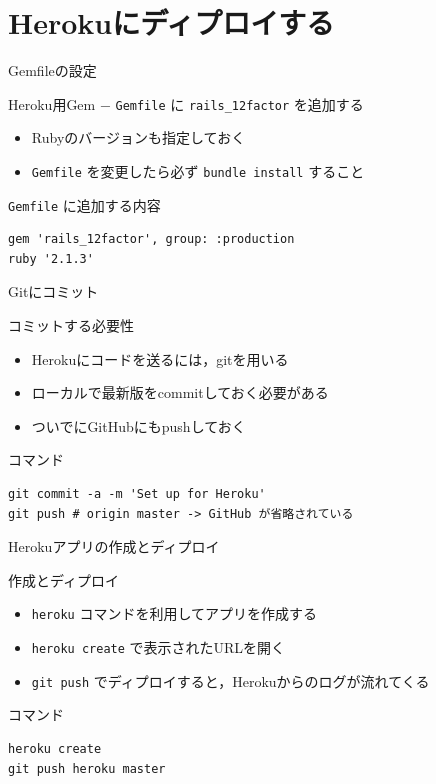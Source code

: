 \documentclass[t, aspectratio=169]{beamer}
\begin{document}
\section{Herokuにディプロイする}
\label{sec-6-3}
\begin{frame}[fragile,label=sec-6-3-1]{Gemfileの設定}
 \begin{block}{Heroku用Gem}
− \texttt{Gemfile} に \texttt{rails\_12factor} を追加する
\begin{itemize}
\item Rubyのバージョンも指定しておく
\item \texttt{Gemfile} を変更したら必ず \texttt{bundle install} すること
\end{itemize}
\end{block}
\begin{block}{\texttt{Gemfile} に追加する内容}
\begin{verbatim}
gem 'rails_12factor', group: :production
ruby '2.1.3'
\end{verbatim}
\end{block}
\end{frame}
\begin{frame}[fragile,label=sec-6-3-2]{Gitにコミット}
 \begin{block}{コミットする必要性}
\begin{itemize}
\item Herokuにコードを送るには，gitを用いる
\item ローカルで最新版をcommitしておく必要がある
\item ついでにGitHubにもpushしておく
\end{itemize}
\end{block}

\begin{block}{コマンド}
\begin{verbatim}
git commit -a -m 'Set up for Heroku'
git push # origin master -> GitHub が省略されている
\end{verbatim}
\end{block}
\end{frame}
\begin{frame}[fragile,label=sec-6-3-3]{Herokuアプリの作成とディプロイ}
 \begin{block}{作成とディプロイ}
\begin{itemize}
\item \texttt{heroku} コマンドを利用してアプリを作成する
\item \texttt{heroku create} で表示されたURLを開く
\item \texttt{git push} でディプロイすると，Herokuからのログが流れてくる
\end{itemize}
\end{block}

\begin{block}{コマンド}
\begin{verbatim}
heroku create
git push heroku master
\end{verbatim}
\end{block}
\end{frame}
\end{document}
